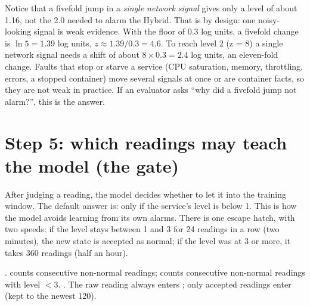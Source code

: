 \begin{warnbox}
Notice that a fivefold jump in a \emph{single network signal} gives only a level of about 1.16, not the 2.0 needed to alarm the Hybrid. That is by design: one noisy-looking signal is weak evidence. With the floor of $0.3$ log units, a fivefold change is $\ln5=1.39$ log units, $z\approx1.39/0.3=4.6$. To reach level 2 (z = 8) a single network signal needs a shift of about $8\times0.3=2.4$ log units, an eleven-fold change. Faults that stop or starve a service (CPU saturation, memory, throttling, errors, a stopped container) move several signals at once or are container facts, so they are not weak in practice. If an evaluator asks ``why did a fivefold jump not alarm?'', this is the answer.
\end{warnbox}

\section{Step 5: which readings may teach the model (the gate)}
\begin{simplebox}
After judging a reading, the model decides whether to let it into the training window. The default answer is: only if the service's level is below 1. This is how the model avoids learning from its own alarms. There is one escape hatch, with two speeds: if the level stays between 1 and 3 for 24 readings in a row (two minutes), the new state is accepted as normal; if the level was at 3 or more, it takes 360 readings (half an hour).
\end{simplebox}

\begin{techbox}
.  counts consecutive non-normal readings;  counts consecutive non-normal readings with level $<3$. . The raw reading always enters ; only accepted readings enter  (kept to the newest 120).
\end{techbox}

